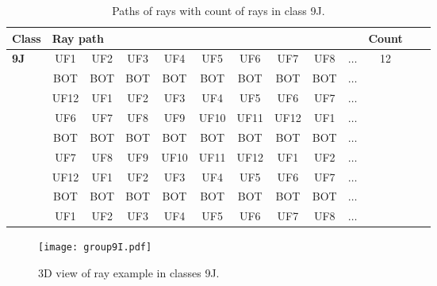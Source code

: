 \clearpage

\begin{table}[h!]
\centering
\begin{tabular}{|l|c|c|c|c|c|c|c|c|c|c|c|c|}
\hline
Class &  \multicolumn{9}{l}{Ray path} \vline  & Count\\
\hline \hline
\textbf{9J} & UF1 & UF2 & UF3 & UF4 & UF5 & UF6 & UF7 & UF8 & $\dots$ & 12\\
 & BOT & BOT & BOT & BOT & BOT & BOT & BOT & BOT & $\dots$ & \\
 & UF12 & UF1 & UF2 & UF3 & UF4 & UF5 & UF6 & UF7 & $\dots$ & \\
 & UF6 & UF7 & UF8 & UF9 & UF10 & UF11 & UF12 & UF1 & $\dots$ & \\
 & BOT & BOT & BOT & BOT & BOT & BOT & BOT & BOT & $\dots$ & \\
 & UF7 & UF8 & UF9 & UF10 & UF11 & UF12 & UF1 & UF2 & $\dots$ & \\
 & UF12 & UF1 & UF2 & UF3 & UF4 & UF5 & UF6 & UF7 & $\dots$ & \\
 & BOT & BOT & BOT & BOT & BOT & BOT & BOT & BOT & $\dots$ & \\
 & UF1 & UF2 & UF3 & UF4 & UF5 & UF6 & UF7 & UF8 & $\dots$ & \\
\hline 
\end{tabular}
\caption{Paths of rays with count of rays in class 9J.}
\label{table:TableClasses6}
\end{table}


\begin{figure}[htps]
\centering
\begin{minipage}[c]{0.325\textwidth}
\texttt{[image: group9I.pdf]}
\end{minipage}
\caption{3D view of ray example in classes 9J.}
\label{fig:modelClass3D1}
\end{figure}



